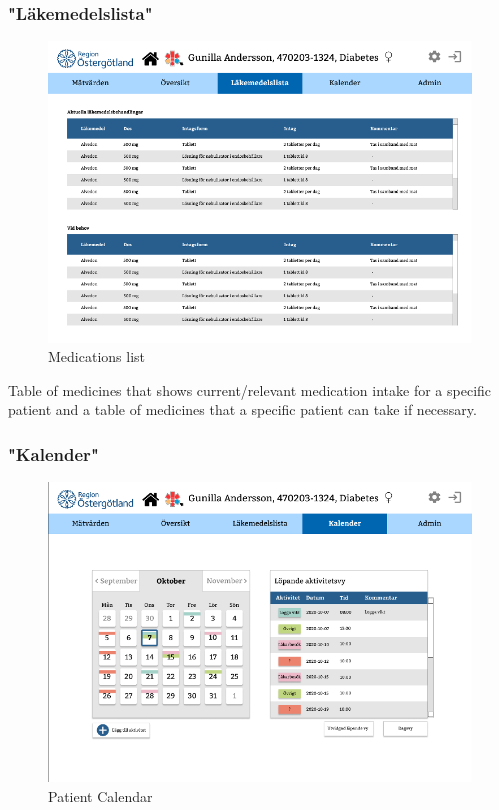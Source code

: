 \documentclass{scrreprt}
\begin{document}
\subsubsection{"Läkemedelslista"}
\begin{figure}[h!]
    \centering
    \includegraphics[width=15cm]{medications.png}
    \caption{Medications list}
    \label{fig: medications}
\end{figure}
Table of medicines that shows current/relevant medication intake for a specific patient and a table of medicines that a specific patient can take if necessary.

\clearpage

\subsubsection{"Kalender"}
\begin{figure}[h!]
    \centering
    \includegraphics[width=15cm]{patcalendar.png}
    \caption{Patient Calendar}
    \label{fig: patcalendar}
\end{figure}
\end{document}
